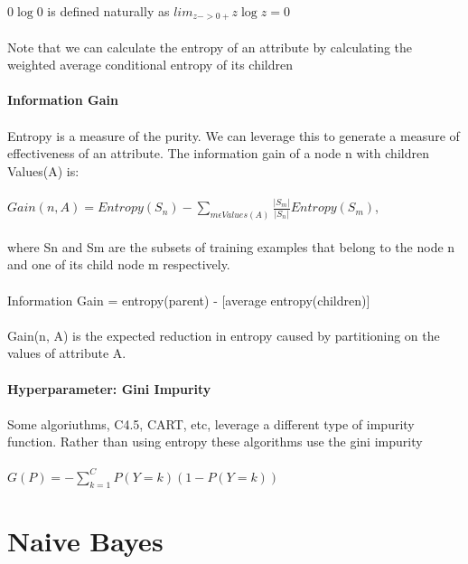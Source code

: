 \documentclass{article}
\begin{document}
\paragraph{}
\(0 \log 0\) is defined naturally as \(lim_{z->0+}z\log z = 0\)\\\\
Note that we can calculate the entropy of an attribute by calculating the weighted average conditional entropy of its children
\paragraph{Information Gain}
\paragraph{}
Entropy is a measure of the purity. We can leverage this to generate a measure of effectiveness of an attribute. The information gain of a node n with children Values(A) is:
\paragraph{}
\(Gain(n, A) = Entropy(S_n) -\sum_{m\epsilon Values(A)} \frac{|S_m|}{|S_n|}Entropy(S_m)\),\\\\
where Sn and Sm are the subsets of training examples that belong to the node n and one of its child node m respectively.\\\\
Information Gain = entropy(parent) - [average entropy(children)]\\\\
Gain(n, A) is the expected reduction in entropy caused by partitioning on the values of attribute A.
\paragraph{Hyperparameter: Gini Impurity}
\paragraph{}
Some algoriuthms, C4.5, CART, etc, leverage a different type of impurity function. Rather than using entropy these algorithms use the gini impurity
\paragraph{}
\(G(P) = -\sum_{k=1}^C P(Y=k)(1-P(Y=k))\)

\section{Naive Bayes}
\end{document}
